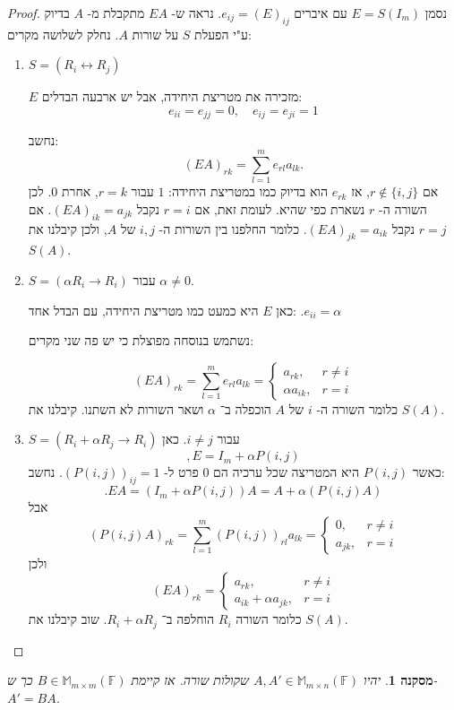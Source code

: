 \documentclass[12pt]{report}
\theoremstyle{plain}
\newtheorem{corollary}[theorem]{מסקנה}
\theoremstyle{definition}
\newcommand{\F}{\mathbb{F}}
\newcommand{\M}{\mathbb{M}}
\newcommand{\0}{\mathbf{0}}
\begin{document}
\begin{proof}
נסמן
$E=S(I_m)$
עם איברים
$e_{ij}=(E)_{ij}$.
נראה ש-
$EA$
מתקבלת מ-
$A$
בדיוק ע"י הפעלת $S$
על שורות
$A$. 
נחלק לשלושה מקרים:

\begin{enumerate}[label=\alph*.]
\item
$S=(R_i\leftrightarrow R_j)$

$E$
מזכירה את מטריצת היחידה, אבל יש ארבעה הבדלים:
$$
e_{ii}=e_{jj}=0, \quad e_{ij}=e_{ji}=1
$$

נחשב:
$$
(EA)_{rk} = \sum_{l=1}^m e_{rl} a_{lk}.
$$
אם
$r \notin \{i,j\}$,
אז $e_{rk}$
הוא בדיוק כמו במטריצת היחידה:
$1$ 
עבור 
$r=k$,
אחרת
$0$.
לכן השורה ה-
$r$
נשארת כפי שהיא.  
לעומת זאת, אם
$r=i$
נקבל
$(EA)_{ik} = a_{jk}$.
אם
$r=j$
נקבל
$(EA)_{jk} = a_{ik}$.  
כלומר החלפנו בין השורות ה-
$i,j$
של 
$A$,
ולכן קיבלנו את
$S(A)$.


\item
$S=(\alpha R_i\to R_i)$
עבור
$\alpha\neq 0$.

כאן
$E$
היא כמעט כמו מטריצת היחידה, עם הבדל אחד:
$
.e_{ii} = \alpha
$

נשתמש בנוסחה מפוצלת כי יש פה שני מקרים:

$$
(EA)_{rk} = \sum_{l=1}^m e_{rl} a_{lk} =
\begin{cases}
a_{rk}, & r \neq i\\
\alpha a_{ik}, & r = i
\end{cases}
$$
כלומר השורה ה-
$i$
של
$A$
הוכפלה ב־
$\alpha$
ושאר השורות לא השתנו. קיבלנו את 
$S(A)$.


\item
$S=(R_i+\alpha R_j\to R_i)$
עבור
$i\neq j$.
כאן
$$
,E = I_m + \alpha P(i,j)
$$
כאשר
$P(i,j)$ 
היא המטריצה שכל ערכיה הם
$0$
פרט ל-
$(P(i,j))_{ij}=1$.
נחשב:
$$
.EA = (I_m + \alpha P(i,j))A = A + \alpha (P(i,j)A)
$$
אבל
$$
(P(i,j)A)_{rk} = \sum_{l=1}^m (P(i,j))_{rl} a_{lk} = \begin{cases}
0, & r \neq i\\
a_{jk}, & r = i
\end{cases}
$$
ולכן
$$
(EA)_{rk} =
\begin{cases}
a_{rk}, & r \neq i\\
a_{ik} + \alpha a_{jk}, & r = i
\end{cases}
$$
כלומר השורה
$R_i$
הוחלפה ב־
$R_i + \alpha R_j$.
שוב קיבלנו את
$S(A)$.


\end{enumerate}
\end{proof}

\begin{corollary}\label{cor:left}
יהיו
$A,A'\in\M_{m\times n}(\F)$
שקולות שורה. אז קיימת 
$B\in\M_{m\times m}(\F)$
כך ש-
$A'=BA$.
\end{corollary}
\end{document}
